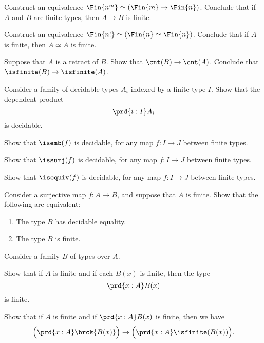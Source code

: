 \begin{exercises}
  \exitem
  \begin{subexenum}
  \item Construct an equivalence $\Fin{n^m}\simeq(\Fin{m}\to\Fin{n})$. Conclude that if $A$ and $B$ are finite types, then $A\to B$ is finite.
  \item Construct an equivalence $\Fin{n!}\simeq(\Fin{n}\simeq\Fin{n})$. Conclude that if $A$ is finite, then $A\simeq A$ is finite.
  \end{subexenum}
  \exitem Suppose that $A$ is a retract of $B$. Show that $\cnt(B)\to\cnt(A)$.
  Conclude that $\isfinite(B)\to\isfinite(A)$.
  \exitem 
  \begin{subexenum}
  \item Consider a family of decidable types $A_i$ indexed by a finite type $I$. Show that the dependent product
    \begin{equation*}
      \prd{i:I}A_i
    \end{equation*}
    is decidable.
  \item Show that $\isemb(f)$ is decidable, for any map $f:I\to J$ between finite types.
  \item Show that $\issurj(f)$ is decidable, for any map $f:I\to J$ between finite types.
  \item Show that $\isequiv(f)$ is decidable, for any map $f:I\to J$ between finite types.
  \end{subexenum}
  \exitem \label{item:quotient-finite-types}Consider a surjective map $f:A\to B$, and suppose that $A$ is finite. Show that the following are equivalent:
    \begin{enumerate}
    \item The type $B$ has decidable equality.
    \item The type $B$ is finite.
    \end{enumerate}
  \exitem Consider a family $B$ of types over $A$.
  \begin{subexenum}
  \item Show that if $A$ is finite and if each $B(x)$ is finite, then the type
    \begin{equation*}
      \prd{x:A}B(x)
    \end{equation*}
    is finite.
  \item Show that if $A$ is finite and if $\prd{x:A}B(x)$ is finite, then we have
    \begin{equation*}
      \Big(\prd{x:A}\brck{B(x)}\Big)\to\Big(\prd{x:A}\isfinite(B(x))\Big).

\end{equation*}
\end{subexenum}
\end{exercises}
